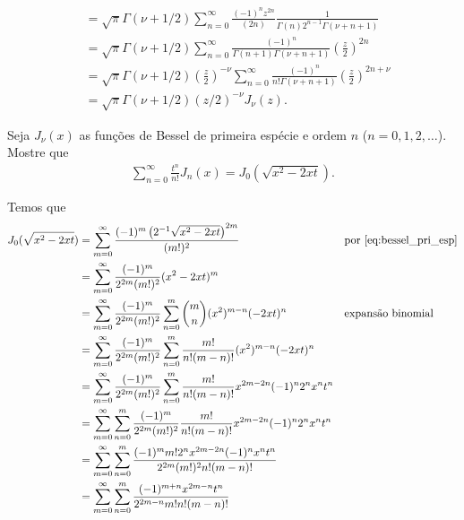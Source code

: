 \documentclass[a4paper,12pt, leqno, answers]{exam}
\begin{document}
\begin{questions}
\begin{solution}
\begin{align*}
            &= \sqrt{\pi} \Gamma(\nu + 1/2) \sum_{n = 0}^\infty \frac{(-1)^n z^{2n}}{(2n)} \frac{1}{\Gamma(n) 2^{n - 1} \Gamma(\nu + n + 1)} \\
            &= \sqrt{\pi} \Gamma(\nu + 1/2) \sum_{n = 0}^\infty \frac{(-1)^n}{\Gamma(n + 1) \Gamma(\nu + n + 1)} \left( \frac{z}{2} \right)^{2n} \\
            &= \sqrt{\pi} \Gamma(\nu + 1/2) \left( \frac{z}{2} \right)^{-\nu} \sum_{n = 0}^\infty \frac{(-1)^n}{n! \Gamma(\nu + n + 1)} \left( \frac{z}{2} \right)^{2 n + \nu} \\
            &= \sqrt{\pi} \Gamma(\nu + 1/2) (z/2)^{- \nu} J_\nu(z).
        \end{align*}
    \end{solution}

    \question[P2 de 2011, E de 2011] Seja $J_\nu(x)$ as fun\c{c}\~{o}es de Bessel de primeira esp\'{e}cie e ordem $n$ ($n = 0, 1, 2, \ldots$). Mostre que
    \begin{align*}
        \sum_{n = 0}^\infty \frac{t^n}{n!} J_n(x) = J_0(\sqrt{x^2 - 2xt}).
    \end{align*}
    \begin{solution}
        Temos que
        \begin{align*}
            J_0(\sqrt{x^2 - 2 x t}) &= \sum_{m = 0}^\infty \frac{(-1)^m \left( 2^{-1} \sqrt{x^2 - 2 x t} \right)^{2m}}{(m!)^2} && \text{por \eqref{eq:bessel_pri_esp}} \\
            &= \sum_{m = 0}^\infty \frac{(-1)^m}{2^{2m} (m!)^2} (x^2 - 2x t)^m \\
            &= \sum_{m = 0}^\infty \frac{(-1)^m}{2^{2m} (m!)^2} \sum_{n = 0}^m \binom{m}{n} (x^2)^{m - n} (-2 x t)^n && \text{expans\~{a}o binomial} \\
            &= \sum_{m = 0}^\infty \frac{(-1)^m}{2^{2m} (m!)^2} \sum_{n = 0}^m \frac{m!}{n! (m - n)!} (x^2)^{m - n} (-2 x t)^n \\
            &= \sum_{m = 0}^\infty \frac{(-1)^m}{2^{2m} (m!)^2} \sum_{n = 0}^m \frac{m!}{n! (m - n)!} x^{2m - 2n} (-1)^n 2^n x^n t^n \\
            &= \sum_{m = 0}^\infty \sum_{n = 0}^m \frac{(-1)^m}{2^{2m} (m!)^2} \frac{m!}{n! (m - n)!} x^{2m - 2n} (-1)^n 2^n x^n t^n \\
            &= \sum_{m = 0}^\infty \sum_{n = 0}^m \frac{(-1)^m m! 2^n x^{2m - 2n} (-1)^n x^n t^n}{2^{2m} (m!)^2 n! (m - n)!} \\
            &= \sum_{m = 0}^\infty \sum_{n = 0}^m \frac{(-1)^{m + n} x^{2m - n} t^n}{2^{2m - n} m! n! (m - n)!} \\

\end{align*}
\end{solution}
\end{questions}
\end{document}

